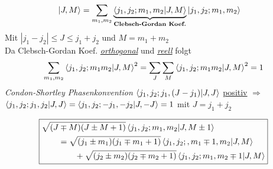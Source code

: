 




{\Huge
\begin{align*}
 \ket{J,M}&= \sum_{m_1,m_2} 
   \underbrace{\braket{j_1,j_2;m_1,m_2}{J,M}}_
   {\text{\textbf{Clebsch-Gordan Koef.}}}
   \ket{j_1,j_2;m_1,m_2}
\end{align*}
Mit  \(|j_1-j_2|\leq J\leq j_1+j_2\) und \( M=m_1+m_2\)\\
Da Clebsch-Gordan Koef. \underline{\textit{orthogonal}} und \underline{\textit{reell}} folgt
\begin{align*}
  \sum_{m_1,m_2}\braket{j_1,j_2;m_1m_2}{J,M}^2= \sum_{J}\sum_{M}\braket{j_1,j_2;m_1m_2}{J,M}^2= 1
\end{align*}
\emph{Condon-Shortley Phasenkonvention} \(\braket{j_1,j_2;j_1,(J-j_1)}{J,J}\) \underline{positiv} \(\Rightarrow\) \(\braket{j_1,j_2;j_1,j_2}{J,J}=\braket{j_1,j_2;-j_1,-j_2}{J,-J}=1\) mit \(J=j_1+j_2\)

\begin{equation*}
  \boxed{
    \begin{split}
      &\sqrt{(J\mp M)
        (J\pm M+1)}\braket{j_1,j_2;m_1,m_2}{J,M\pm 1}\\
      &\qquad
      = \sqrt{(j_1\pm m_1)(j_1\mp m_1+1)}
      \braket{j_1,j_2;,m_1\mp 1,m_2}{J,M}\\
      &\qquad\qquad
      +\sqrt{(j_2\pm m_2)(j_2\mp m_2+1)}
      \braket{j_1,j_2;m_1,m_2\mp 1}{J,M}
    \end{split}}
\end{equation*}


}%


